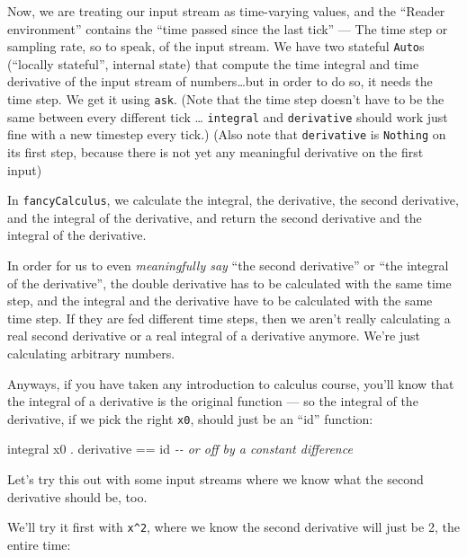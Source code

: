 \documentclass[]{article}
\newenvironment{Shaded}{}{}
\newcommand{\CommentTok}[1]{\textcolor[rgb]{0.38,0.63,0.69}{\textit{#1}}}
\newcommand{\FunctionTok}[1]{\textcolor[rgb]{0.02,0.16,0.49}{#1}}
\newcommand{\NormalTok}[1]{#1}
\newcommand{\OperatorTok}[1]{\textcolor[rgb]{0.40,0.40,0.40}{#1}}
\begin{document}
Now, we are treating our input stream as time-varying values, and the ``Reader
environment'' contains the ``time passed since the last tick'' --- The time step
or sampling rate, so to speak, of the input stream. We have two stateful
\texttt{Auto}s (``locally stateful'', internal state) that compute the time
integral and time derivative of the input stream of numbers\ldots but in order
to do so, it needs the time step. We get it using \texttt{ask}. (Note that the
time step doesn't have to be the same between every different tick \ldots{}
\texttt{integral} and \texttt{derivative} should work just fine with a new
timestep every tick.) (Also note that \texttt{derivative} is \texttt{Nothing} on
its first step, because there is not yet any meaningful derivative on the first
input)

In \texttt{fancyCalculus}, we calculate the integral, the derivative, the second
derivative, and the integral of the derivative, and return the second derivative
and the integral of the derivative.

In order for us to even \emph{meaningfully say} ``the second derivative'' or
``the integral of the derivative'', the double derivative has to be calculated
with the same time step, and the integral and the derivative have to be
calculated with the same time step. If they are fed different time steps, then
we aren't really calculating a real second derivative or a real integral of a
derivative anymore. We're just calculating arbitrary numbers.

Anyways, if you have taken any introduction to calculus course, you'll know that
the integral of a derivative is the original function --- so the integral of the
derivative, if we pick the right \texttt{x0}, should just be an ``id'' function:

\begin{Shaded}
\begin{Highlighting}[]
\NormalTok{integral x0 }\OperatorTok{.}\NormalTok{ derivative }\OperatorTok{==} \FunctionTok{id}      \CommentTok{{-}{-} or off by a constant difference}
\end{Highlighting}
\end{Shaded}

Let's try this out with some input streams where we know what the second
derivative should be, too.

We'll try it first with \texttt{x\^{}2}, where we know the second derivative
will just be 2, the entire time:
\end{document}
